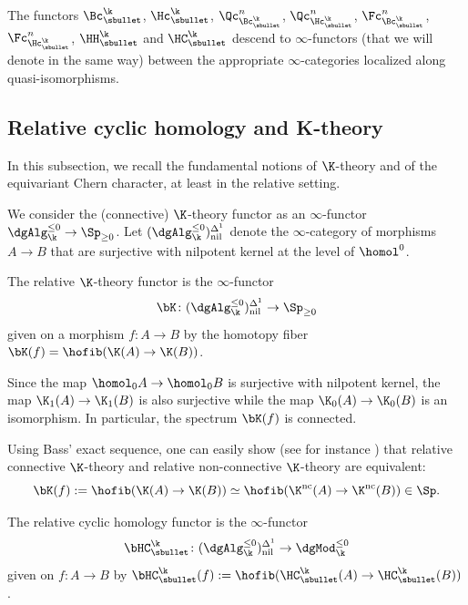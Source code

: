 \begin{cor}
The functors $\Bc_\sbullet^\k$, $\Hc_\sbullet^\k$, $\Qc_{\Bc_\sbullet^\k}^n$, $\Qc_{\Hc_\sbullet^\k}^n$, $\Fc_{\Bc_\sbullet^\k}^n$, $\Fc_{\Hc_\sbullet^\k}^n$, $\HH_\sbullet^\k$ and $\HC_\sbullet^\k$ descend to $\infty$-functors (that we will denote in the same way) between the appropriate $\infty$-categories localized along quasi-isomorphisms.
\end{cor}

\subsection{Relative cyclic homology and K-theory}\label{subsec:relK}
In this subsection, we recall the fundamental notions of $\K$-theory and of the equivariant Chern character, at least in the relative setting.

We consider the (connective) $\K$-theory functor as an $\infty$-functor $\dgAlg_\k^{\leq 0} \to \Sp_{\geq 0}$.
Let $(\dgAlg_\k^{\leq 0})^{\Delta^1}_\mathrm{nil}$ denote the $\infty$-category of morphisms $A \to B$ that are surjective with nilpotent kernel at the level of $\homol^0$.

\begin{df}
The relative $\K$-theory functor is the $\infty$-functor
\[
\bK \colon (\dgAlg_\k^{\leq 0})^{\Delta^1}_\mathrm{nil} \to \Sp_{\geq 0}
\]
given on a morphism $f \colon A \to B$ by the homotopy fiber $\bK(f) = \hofib(\K(A) \to \K(B))$.
\end{df}
Since the map $\homol_0A \to \homol_0B$ is surjective with nilpotent kernel, the map $\K_1(A) \to \K_1(B)$ is also surjective while the map $\K_0(A) \to \K_0(B)$ is an isomorphism. In particular, the spectrum $\bK(f)$ is connected.

\begin{rmq}\label{rmk:relKnc}
Using Bass' exact sequence, one can easily show (see for instance \cite[\S 2.8]{beilinson:relK}) that relative connective $\K$-theory and relative non-connective $\K$-theory are equivalent:
\[
\bK(f) := \hofib(\K(A) \to \K(B)) \simeq \hofib(\K^\mathrm{nc}(A) \to \K^\mathrm{nc}(B)) \in \Sp.
\]
\end{rmq}

\begin{df}
The relative cyclic homology functor is the $\infty$-functor
\[
\bHC_\sbullet^\k \colon (\dgAlg_\k^{\leq 0})^{\Delta^1}_\mathrm{nil} \to \dgMod_\k^{\leq 0}
\]
given on $f \colon A \to B$ by $\bHC_\sbullet^\k(f) := \hofib(\HC_\sbullet^\k(A) \to \HC_\sbullet^\k(B))$.
\end{df}

